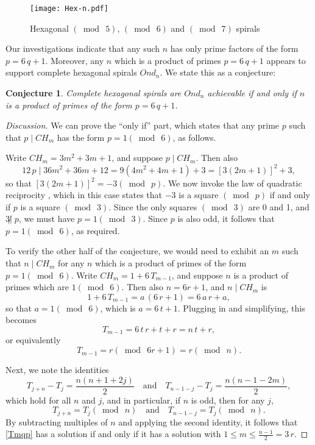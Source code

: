 \documentclass{article}
\newtheorem{conj}{Conjecture}
\theoremstyle{definition}
\def\pmod#1{(\bmod\  #1)}
\def\com#1{\quad\text{{#1}}\quad}
\def\ndiv{{\not|\;}}
\begin{document}
\begin{figure}[htb]
  \centering
  \texttt{[image: Hex-n.pdf]}
  \caption{Hexagonal $\pmod5$, $\pmod6$ and $\pmod 7$ spirals}
  \label{fig:hexN}
\end{figure}

Our investigations indicate that any such $n$ has only prime factors
of the form $p=6\,q+1$.  Moreover, any $n$ which is a product of
primes $p=6\,q+1$ appears to support complete hexagonal spirals
$Ond_n$.  We state this as a conjecture:

\begin{conj}
  Complete hexagonal spirals are $Ond_n$ achievable if and only if $n$
  is a product of primes of the form $p=6\,q+1$.
\end{conj}

\begin{proof}[Discussion]
We can prove the ``only if'' part, which states that any prime $p$
such that $p\mid CH_m$ has the form $p=1\pmod6$, as follows.

Write $CH_m = 3m^2+3m+1$, and suppose $p\mid CH_m$.  Then also
\[
  12\,p\mid 36m^2+36m+12 = 9(4m^2+4m+1)+3 = [3(2m+1)]^2+3,
\]
so that $[3(2m+1)]^2 = -3 \pmod p$.  We now invoke the law of
quadratic reciprocity \cite{Davenport}, which in this case states that $-3$ is
a square $\pmod p$ if and only if $p$ is a square $\pmod 3$.  Since
the only squares $\pmod 3$ are 0 and 1, and $3\ndiv p$, we must have
$p=1\pmod 3$.  Since $p$ is also odd, it follows that $p=1\pmod 6$, as
required.

To verify the other half of the conjecture, we would need to exhibit
an $m$ such that $n\mid CH_m$ for any $n$ which is a product of primes
of the form $p=1\pmod 6$.  Write $CH_m = 1 + 6\,T_{m-1}$, and suppose
$n$ is a product of primes which are $1\pmod6$.  Then also $n=6r+1$,
and $n\mid CH_m$ is
\[
  1 + 6\,T_{m-1} = a\,(6\,r+1) = 6\,a\,r + a,
\]
so that $a = 1\pmod 6$, which is $a=6\,t+1$.  Plugging in and
simplifying, this becomes
\[
  T_{m-1} = 6\,t\,r + t + r = n\,t + r,
\]
or equivalently
\begin{equation}
  T_{m-1} = r \pmod {6r+1} = r \pmod n.
  \label{Tmqp}
\end{equation}

Next, we note the identities
\[
  T_{j+n} - T_j = \frac{n(n+1+2j)}2  \com{and}
  T_{n-1-j} - T_j = \frac{n(n-1-2m)}2,
\]
which hold for all $n$ and $j$, and in particular, if $n$ is odd, then
for any $j$,
\[
  T_{j+n} = T_j\pmod n \com{and}  T_{n-1-j} = T_j\pmod n.
\]
By subtracting multiples of $n$ and applying the second identity, it
follows that \eqref{Tmqp} has a solution if and only if it has a 
solution with $1\le m\le \frac{n-1}2 = 3\,r$.
\end{proof}
\end{document}
